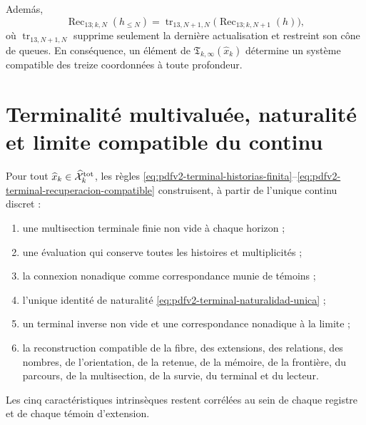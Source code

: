 Adem\'as,
\begin{equation}
\label{eq:pdfv2-terminal-recuperacion-compatible}
 \operatorname{Rec}_{13;k,N}(h_{\leq N})
 =\operatorname{tr}_{13,N+1,N}
   \bigl(\operatorname{Rec}_{13;k,N+1}(h)\bigr),
\end{equation}
où \(\operatorname{tr}_{13,N+1,N}\) supprime seulement la dernière actualisation et restreint son cône de queues. En conséquence, un élément de \(\mathfrak T_{k,\infty}(\widehat x_k)\) détermine un système compatible des treize coordonnées à toute profondeur.

\section{Terminalité multivaluée, naturalité et limite compatible du continu}

\begin{theorem}
\label{thm:pdfv2-terminal-conjunto}
Pour tout \(\widehat x_k\in\widehat{\mathcal X}^{\rm tot}_k\), les règles \eqref{eq:pdfv2-terminal-historias-finita}--\eqref{eq:pdfv2-terminal-recuperacion-compatible} construisent, à partir de l'unique continu discret :
\begin{enumerate}
 \item une multisection terminale finie non vide à chaque horizon ;
 \item une évaluation qui conserve toutes les histoires et multiplicités ;
 \item la connexion nonadique comme correspondance munie de témoins ;
 \item l'unique identité de naturalité \eqref{eq:pdfv2-terminal-naturalidad-unica} ;
 \item un terminal inverse non vide et une correspondance nonadique à la limite ;
 \item la reconstruction compatible de la fibre, des extensions, des relations, des nombres, de l'orientation, de la retenue, de la mémoire, de la frontière, du parcours, de la multisection, de la survie, du terminal et du lecteur.
\end{enumerate}
Les cinq caractéristiques intrinsèques restent corrélées au sein de chaque registre et de chaque témoin d'extension.
\end{theorem}

